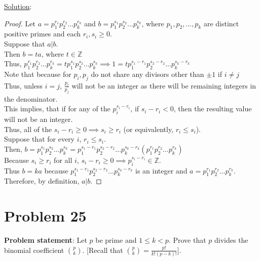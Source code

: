 \documentclass{article} %
\begin{document}
\underline{Solution}: 
\begin{addmargin}[1em]{0em}
\begin{proof}
Let $a = p_1^{r_1}p_2^{r_2} \ldots p_k^{r_k}$ and $b = p_1^{s_1}p_2^{s_2} \ldots p_k^{s_k}$, where $p_1,p_2,\ldots,p_k$ are distinct positive primes and each $r_i,s_i \geq 0$.
\\ \marginpar{$\Rightarrow$}
Suppose that $a|b$.
\\Then $b = ta$, where $t \in \mathbb{Z}$
\\Thus, $p_1^{r_1}p_2^{r_2} \ldots p_k^{r_k} = tp_1^{s_1}p_2^{s_2} \ldots p_k^{s_k} \implies 1 = tp_1^{s_1 - r_1}p_2^{s_2-r_2} \ldots p_k^{s_k-r_k}$
\\Note that because for $p_i, p_j$ do not share any divisors other than $\pm 1$ if $i \neq j$
\\Thus, unless $i = j$, $\frac{p_i}{p_j}$ will not be an integer as there will be remaining integers in the denominator.
\\This implies, that if for any of the $p_i^{s_i - r_i}$, if $s_i - r_i < 0$, then the resulting value will not be an integer.
\\Thus, all of the $s_i - r_i \geq 0 \implies s_i \geq r_i$ (or equivalently, $r_i \leq s_i$).
\\ \marginpar{$\Leftarrow$}
Suppose that for every $i$, $r_i \leq s_i$.
\\Then, $b = p_1^{s_1}p_2^{s_2} \ldots p_k^{s_k} = p_1^{s_1 - r_1}p_2^{s_2 - r_2} \ldots p_k^{s_k - r_k} (p_1^{r_1}p_2^{r_2} \ldots p_k^{r_k})$
\\Because $s_i \geq r_i$ for all $i$, $s_i - r_i \geq 0 \implies p_i^{s_i - r_i} \in \mathbb{Z}$.
\\Thus $b = ka$ because $p_1^{s_1 - r_1}p_2^{s_2 - r_2} \ldots p_k^{s_k - r_k}$ is an integer and $a = p_1^{r_1}p_2^{r_2} \ldots p_k^{r_k}$.
\\Therefore, by definition, $a|b$.
\end{proof}
\end{addmargin}

\newpage

\section*{Problem 25}


\textbf{Problem statement}: Let $p$ be prime and $1 \leq k < p$.  Prove that $p$ divides the binomial coefficient $\binom{p}{k}$.  [Recall that $\binom{p}{k} = \frac{p!}{k!(p-k)!}$].
\\
\end{document}
